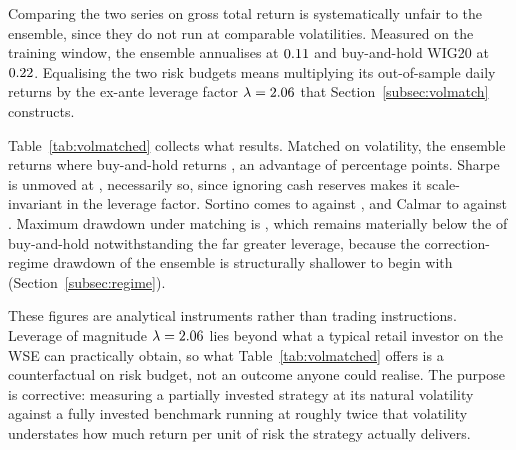 Comparing the two series on gross total return is systematically unfair to the ensemble, since they do not run at comparable volatilities. Measured on the training window, the ensemble annualises at $0.11{}$ and buy-and-hold WIG20 at $0.22{}$. Equalising the two risk budgets means multiplying its out-of-sample daily returns by the ex-ante leverage factor $\lambda = 2.06{}$ that Section~\ref{subsec:volmatch} constructs.

Table~\ref{tab:volmatched} collects what results. Matched on volatility, the ensemble returns \VolScaledTR{} where buy-and-hold returns \BHtest{}, an advantage of \VolScaledExcessPP{} percentage points. Sharpe is unmoved at \VolScaledSharpe{}, necessarily so, since ignoring cash reserves makes it scale-invariant in the leverage factor. Sortino comes to \VolScaledSortino{} against \BHSortino{}, and Calmar to \VolScaledCalmar{} against \Calmbh{}. Maximum drawdown under matching is \VolScaledMDD{}, which remains materially below the \MDDbh{} of buy-and-hold notwithstanding the far greater leverage, because the correction-regime drawdown of the ensemble is structurally shallower to begin with (Section~\ref{subsec:regime}).

These figures are analytical instruments rather than trading instructions. Leverage of magnitude $\lambda = 2.06{}$ lies beyond what a typical retail investor on the WSE can practically obtain, so what Table~\ref{tab:volmatched} offers is a counterfactual on risk budget, not an outcome anyone could realise. The purpose is corrective: measuring a partially invested strategy at its natural volatility against a fully invested benchmark running at roughly twice that volatility understates how much return per unit of risk the strategy actually delivers.

